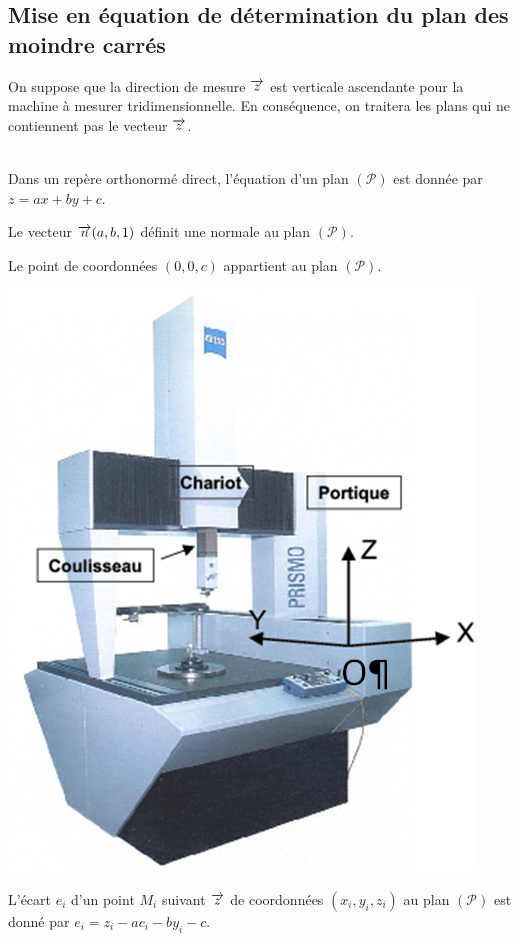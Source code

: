\documentclass[10pt,fleqn]{article} %
\begin{document}
\subsection{Mise en équation de détermination du plan des moindre carrés}
\ifprof
\else
\noindent\begin{minipage}[c]{.75\linewidth}
On suppose que la direction de mesure $\overrightarrow{z}$ est verticale ascendante pour la machine à mesurer tridimensionnelle. En conséquence, on traitera les plans qui ne contiennent pas le vecteur $\overrightarrow{z}$.

\begin{rappel}
$\quad$\\

Dans un repère orthonormé direct, l'équation d'un plan $\left( \mathcal{P}\right)$ est donnée par $z=ax+by+c$.

Le vecteur $\overrightarrow{n}(a,b,1)$ définit une normale au plan $\left( \mathcal{P}\right)$.

Le point de coordonnées $(0,0,c)$ appartient au plan $\left( \mathcal{P}\right)$.

\end{rappel}
\end{minipage} \hfill
\begin{minipage}[c]{.2\linewidth}
\begin{center}
\includegraphics[width=.95\textwidth]{images/MMT}
\end{center}
\end{minipage}
L'écart $e_i$ d'un point  $M_i$ suivant $\overrightarrow{z}$ de coordonnées $\left(x_i,y_i,z_i\right)$ au plan $\left( \mathcal{P}\right)$ est donné par 
$e_i = z_i -ac_i -by_i -c$.
\end{document}
